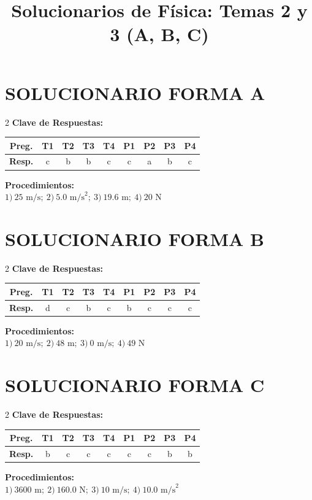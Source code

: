 \documentclass[10pt]{article}
\title{\vspace{-1.5cm}\Large Solucionarios de Física: Temas 2 y 3 (A, B, C)}
\author{}
\date{\vspace{-1.5cm}}
\begin{document}
\maketitle

\section*{SOLUCIONARIO FORMA A}
\begin{multicols}{2}
\textbf{Clave de Respuestas:}\\[1ex]
\begin{tabular}{|c|c|c|c|c|c|c|c|c|}
\hline \textbf{Preg.} & T1 & T2 & T3 & T4 & P1 & P2 & P3 & P4 \\ 
\hline \textbf{Resp.} & c & b & b & c & c & a & b & c \\ \hline
\end{tabular}

\columnbreak
\textbf{Procedimientos:}\\[1ex]
$1)\ 25 \text{ m/s};\ 2)\ 5.0 \text{ m/s}^2;\ 3)\ 19.6 \text{ m};\ 4)\ 20 \text{ N}$
\end{multicols}

\vspace{2mm}

\section*{SOLUCIONARIO FORMA B}
\begin{multicols}{2}
\textbf{Clave de Respuestas:}\\[1ex]
\begin{tabular}{|c|c|c|c|c|c|c|c|c|}
\hline \textbf{Preg.} & T1 & T2 & T3 & T4 & P1 & P2 & P3 & P4 \\ 
\hline \textbf{Resp.} & d & c & b & c & b & c & c & c \\ \hline
\end{tabular}

\columnbreak
\textbf{Procedimientos:}\\[1ex]
$1)\ 20 \text{ m/s};\ 2)\ 48 \text{ m};\ 3)\ 0 \text{ m/s};\ 4)\ 49 \text{ N}$
\end{multicols}

\vspace{2mm}

\section*{SOLUCIONARIO FORMA C}
\begin{multicols}{2}
\textbf{Clave de Respuestas:}\\[1ex]
\begin{tabular}{|c|c|c|c|c|c|c|c|c|}
\hline \textbf{Preg.} & T1 & T2 & T3 & T4 & P1 & P2 & P3 & P4 \\ 
\hline \textbf{Resp.} & b & c & c & c & c & c & b & b \\ \hline
\end{tabular}

\columnbreak
\textbf{Procedimientos:}\\[1ex]
$1)\ 3600 \text{ m};\ 2)\ 160.0 \text{ N};\ 3)\ 10 \text{ m/s};\ 4)\ 10.0 \text{ m/s}^2$
\end{multicols}
\end{document}
